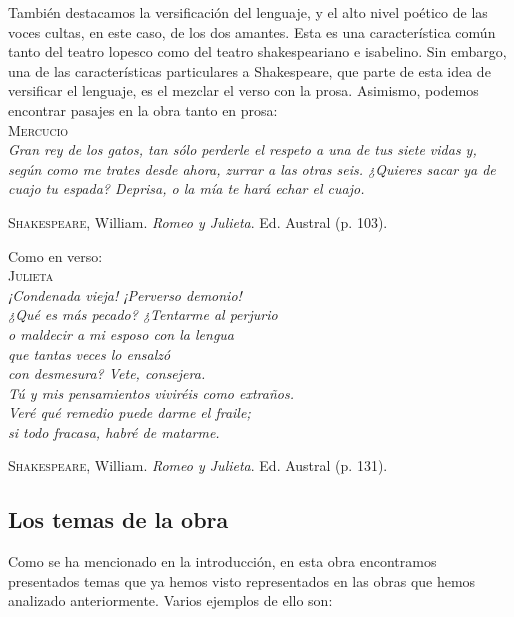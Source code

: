 \documentclass[12pt,a4paper]{article}
\begin{document}
También destacamos la versificación del lenguaje, y el alto nivel poético de las voces cultas, en este caso, de los dos amantes. Esta es una característica común tanto del teatro lopesco como del teatro shakespeariano e isabelino. Sin embargo, una de las características particulares a Shakespeare, que parte de esta idea de versificar el lenguaje, es el mezclar el verso con la prosa. Asimismo, podemos encontrar pasajes en la obra tanto en prosa:\\

\textsc{Mercucio}\\
\indent\textit{Gran rey de los gatos, tan sólo perderle el respeto a una de tus siete vidas y, según como me trates desde ahora, zurrar a las otras seis. ¿Quieres sacar ya de cuajo tu espada? Deprisa, o la mía te hará echar el cuajo.}\\
\begin{flushright}
	\textsc{Shakespeare}, William. \textit{Romeo y Julieta}. Ed. Austral (p. 103).\\
\end{flushright}

Como en verso:\\

\textsc{Julieta}\\
\indent\textit{¡Condenada vieja! ¡Perverso demonio!}\\
\indent\textit{¿Qué es más pecado? ¿Tentarme al perjurio}\\
\indent\textit{o maldecir a mi esposo con la lengua}\\
\indent\textit{que tantas veces lo ensalzó}\\
\indent\textit{con desmesura? Vete, consejera.}\\
\indent\textit{Tú y mis pensamientos viviréis como extraños.}\\
\indent\textit{Veré qué remedio puede darme el fraile;}\\
\indent\textit{si todo fracasa, habré de matarme.}\\
\begin{flushright}
	\textsc{Shakespeare}, William. \textit{Romeo y Julieta}. Ed. Austral (p. 131).\\
\end{flushright}

\subsection{Los temas de la obra}

Como se ha mencionado en la introducción, en esta obra encontramos presentados temas que ya hemos visto representados en las obras que hemos analizado anteriormente. Varios ejemplos de ello son:
\end{document}
